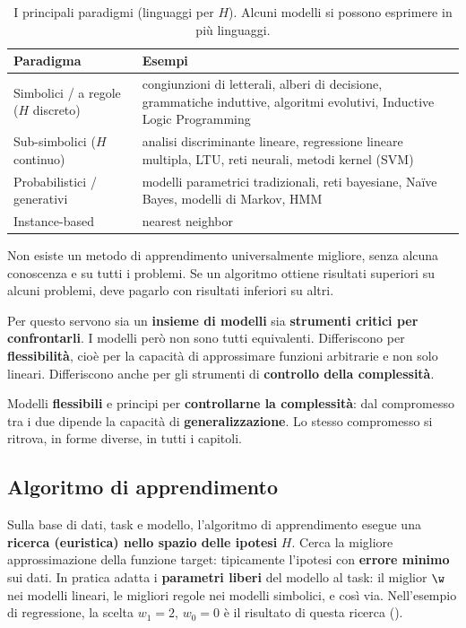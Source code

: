 \begin{table}[ht]
\centering\small
\caption{I principali paradigmi (linguaggi per $H$). Alcuni modelli si possono esprimere in più linguaggi.}
\label{tab:paradigmi}
\begin{tabularx}{0.95\linewidth}{>{\raggedright\arraybackslash}p{4.1cm}X}
\toprule
Paradigma & Esempi \\
\midrule
Simbolici / a regole ($H$ discreto) & congiunzioni di letterali, alberi di decisione, grammatiche induttive, algoritmi evolutivi, Inductive Logic Programming \\
Sub-simbolici ($H$ continuo) & analisi discriminante lineare, regressione lineare multipla, LTU, reti neurali, metodi kernel (SVM) \\
Probabilistici / generativi & modelli parametrici tradizionali, reti bayesiane, Naïve Bayes, modelli di Markov, HMM \\
Instance-based & nearest neighbor \\
\bottomrule
\end{tabularx}
\end{table}

\begin{teorema}
Non esiste un metodo di apprendimento universalmente migliore, senza alcuna conoscenza e su tutti i problemi. Se
un algoritmo ottiene risultati superiori su alcuni problemi, deve pagarlo con risultati inferiori su altri.
\end{teorema}

Per questo servono sia un \textbf{insieme di modelli} sia \textbf{strumenti critici per confrontarli}. I modelli
però non sono tutti equivalenti. Differiscono per \textbf{flessibilità}, cioè per la capacità di approssimare
funzioni arbitrarie e non solo lineari. Differiscono anche per gli strumenti di \textbf{controllo della
complessità}.

\begin{idea}
Modelli \textbf{flessibili} e principi per \textbf{controllarne la complessità}: dal compromesso tra i due
dipende la capacità di \textbf{generalizzazione}. Lo stesso compromesso si ritrova, in forme diverse, in tutti i
capitoli.
\end{idea}

\subsection{Algoritmo di apprendimento}

Sulla base di dati, task e modello, l'algoritmo di apprendimento esegue una \textbf{ricerca (euristica) nello
spazio delle ipotesi} $H$. Cerca la migliore approssimazione della funzione target: tipicamente l'ipotesi con
\textbf{errore minimo} sui dati. In pratica adatta i \textbf{parametri liberi} del modello al task: il miglior
$\w$ nei modelli lineari, le migliori regole nei modelli simbolici, e così via. Nell'esempio di regressione, la
scelta $w_1=2$, $w_0=0$ è il risultato di questa ricerca ().

